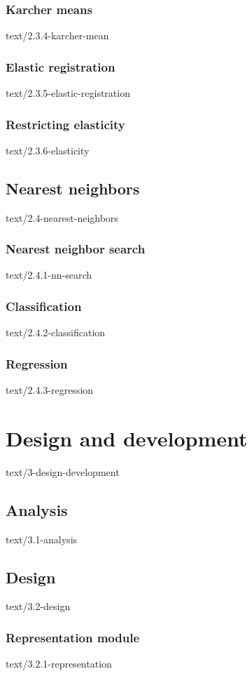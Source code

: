 \documentclass[epsbased,copyleft,final,loe, lof,extendedindex,firstnumbered,tfg,english]{tfgtfmthesisuam}
\begin{document}
  \subsection{Karcher means\label{SEC:KARCHER}}{text/2.3.4-karcher-mean}
  \subsection{Elastic registration\label{SEC:ELASTICREG}}{text/2.3.5-elastic-registration}
  \subsection{Restricting elasticity\label{SEC:RESTRICT}}{text/2.3.6-elasticity}

\section{Nearest neighbors\label{SEC:NEIGHBORS}}{text/2.4-nearest-neighbors}
  \subsection{Nearest neighbor search\label{SEC:SEARCH}}{text/2.4.1-nn-search}
  \subsection{Classification\label{SEC:SEARCH}}{text/2.4.2-classification}
  \subsection{Regression\label{SEC:SEARCH}}{text/2.4.3-regression}


\chapter{Design and development\label{CAP:DESIGNDEV}}{text/3-design-development}

\section{Analysis\label{SEC:ANALYSIS}}{text/3.1-analysis}
\section{Design\label{SEC:DESIGN}}{text/3.2-design}
  \subsection{Representation module\label{SEC:REPRMOD}}{text/3.2.1-representation}
\end{document}
